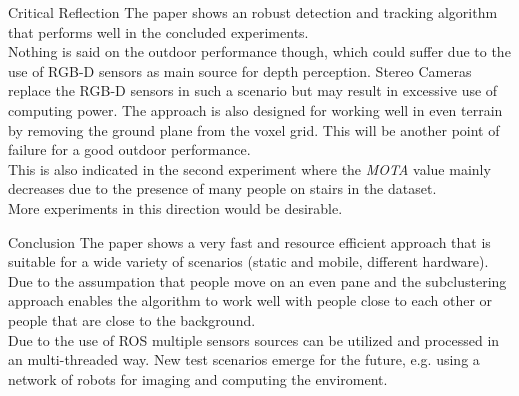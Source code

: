 \documentclass[a4paper,oneside,10pt,DIV12,headsepline,footexclude,headexclude]{scrartcl}
\begin{document}
\begin{section}{Critical Reflection}
The paper shows an robust detection and tracking algorithm that performs well
in the concluded experiments.\\
Nothing is said on the outdoor performance though, which could suffer due to the
use of RGB-D sensors as main source for depth perception. Stereo Cameras replace
the RGB-D sensors in such a scenario but may result in excessive use of computing
power. The approach is also designed for working well in even terrain by removing
the ground plane from the voxel grid. This will be another point of failure for
a good outdoor performance. \\ 
This is also indicated in the second experiment where the \textit{MOTA} value
mainly decreases due to the presence of many people on stairs in the dataset. \\
More experiments in this direction would be desirable.

\end{section}
\begin{section}{Conclusion}
The paper shows a very fast and resource efficient approach that is suitable for
a wide variety of scenarios (static and mobile, different hardware).
Due to the assumpation that people move on an even pane and the subclustering approach
enables the algorithm to work well with people close to each other or people that
are close to the background.\\
Due to the use of ROS multiple sensors sources can be utilized and processed in an
multi-threaded way.
New test scenarios emerge for the future, e.g. using a network of robots for
imaging and computing the enviroment.

\end{section}




\end{document}
